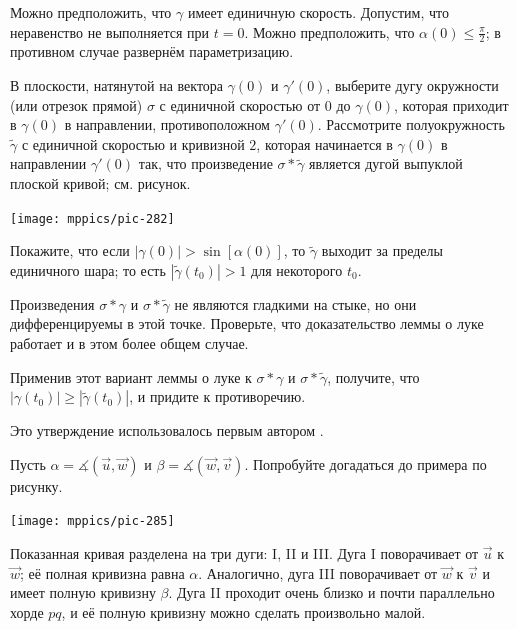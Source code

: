 \begin{multicols}{2}
Можно предположить, что $\gamma$ имеет единичную скорость.
Допустим, что неравенство не выполняется при $t=0$.
Можно предположить, что $\alpha(0)\le\tfrac\pi2$;
в противном случае развернём параметризацию.

В плоскости, натянутой на вектора $\gamma(0)$ и $\gamma'(0)$, выберите дугу окружности (или отрезок прямой) $\sigma$ с единичной скоростью от $0$ до $\gamma(0)$, которая приходит в $\gamma(0)$ в направлении, противоположном $\gamma'(0)$.
Рассмотрите полуокружность $\tilde\gamma$ с единичной скоростью и кривизной $2$, которая начинается в $\gamma(0)$ в направлении $\gamma'(0)$ так, что произведение $\sigma*\tilde\gamma$ является дугой выпуклой плоской кривой; см. рисунок.

\begin{Figure}
\vskip-1mm
\centering
\texttt{[image: mppics/pic-282]}
\vskip-1mm
\end{Figure}

Покажите, что если $|\gamma(0)|> \sin[\alpha(0)]$, то $\tilde\gamma$ выходит за пределы единичного шара; то есть $|\tilde\gamma(t_0)|>1$ для некоторого $t_0$.

Произведения $\sigma*\gamma$ и $\sigma*\tilde\gamma$ не являются гладкими на стыке, но они дифференцируемы в этой точке.
Проверьте, что доказательство леммы о луке работает и в этом более общем случае.

Применив этот вариант леммы о луке к $\sigma*\gamma$ и $\sigma*\tilde\gamma$, получите, что $|\gamma(t_0)|\ge |\tilde\gamma(t_0)|$, и придите к противоречию.

 Это утверждение использовалось первым автором \cite{petrunin2023}.



\setcounter{eqtn}{0}

Пусть $\alpha=\measuredangle(\vec u,\vec w)$ 
и $\beta=\measuredangle(\vec w,\vec v)$.
Попробуйте догадаться до примера по рисунку.

\begin{Figure}
\vskip-1mm
\centering
\texttt{[image: mppics/pic-285]}
\vskip-1mm
\end{Figure}

Показанная кривая разделена на три дуги: I, II и III. 
Дуга I поворачивает от $\vec u$ к $\vec w$;
её полная кривизна равна $\alpha$.
Аналогично, дуга III поворачивает от $\vec w$ к $\vec v$ и имеет полную кривизну $\beta$. 
Дуга II проходит очень близко и почти параллельно хорде $pq$, и её полную кривизну можно сделать произвольно малой.


\end{multicols}
